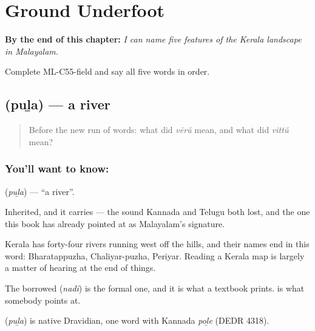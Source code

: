 
\chapter{Ground Underfoot}
\label{ch:ml-ground-underfoot}

\begin{chapteropening}
\textbf{By the end of this chapter:} \emph{I can name five features of the Kerala landscape in Malayalam.}

Complete ML-C55-field and say all five words in order.
\end{chapteropening}

\section[\texorpdfstring{\ml{പുഴ} (puḻa)}{പുഴ (puḻa)}]{ (puḻa) — a river}

\label{lesson:ML-C55-river}



\begin{quote}
Before the new run of words: what did \emph{vērŭ} mean, and what did \emph{vittŭ} mean?
\end{quote}

\subsection*{You'll want to know: }
\textbf{} (\emph{puḻa}) — \textquotedblleft{}a river\textquotedblright{}.

Inherited, and it carries  — the sound Kannada and Telugu both lost, and the one this book has already pointed at as Malayalam's signature.

Kerala has forty-four rivers running west off the hills, and their names end in this word: Bharatappuzha, Chaliyar-puzha, Periyar. Reading a Kerala map is largely a matter of hearing  at the end of things.

The borrowed  (\emph{nadi}) is the formal one, and it is what a textbook prints.  is what somebody points at.

\begin{cousinweb}
\textbf{} (\emph{puḻa}) is native Dravidian, one word with Kannada \emph{poḻe} (DEDR 4318).
\end{cousinweb}

